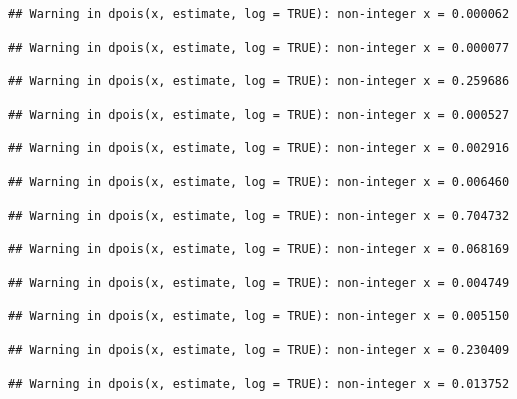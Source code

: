 \documentclass[]{article}
\begin{document}
\begin{verbatim}
## Warning in dpois(x, estimate, log = TRUE): non-integer x = 0.000062
\end{verbatim}

\begin{verbatim}
## Warning in dpois(x, estimate, log = TRUE): non-integer x = 0.000077
\end{verbatim}

\begin{verbatim}
## Warning in dpois(x, estimate, log = TRUE): non-integer x = 0.259686
\end{verbatim}

\begin{verbatim}
## Warning in dpois(x, estimate, log = TRUE): non-integer x = 0.000527
\end{verbatim}

\begin{verbatim}
## Warning in dpois(x, estimate, log = TRUE): non-integer x = 0.002916
\end{verbatim}

\begin{verbatim}
## Warning in dpois(x, estimate, log = TRUE): non-integer x = 0.006460
\end{verbatim}

\begin{verbatim}
## Warning in dpois(x, estimate, log = TRUE): non-integer x = 0.704732
\end{verbatim}

\begin{verbatim}
## Warning in dpois(x, estimate, log = TRUE): non-integer x = 0.068169
\end{verbatim}

\begin{verbatim}
## Warning in dpois(x, estimate, log = TRUE): non-integer x = 0.004749
\end{verbatim}

\begin{verbatim}
## Warning in dpois(x, estimate, log = TRUE): non-integer x = 0.005150
\end{verbatim}

\begin{verbatim}
## Warning in dpois(x, estimate, log = TRUE): non-integer x = 0.230409
\end{verbatim}

\begin{verbatim}
## Warning in dpois(x, estimate, log = TRUE): non-integer x = 0.013752
\end{verbatim}
\end{document}
